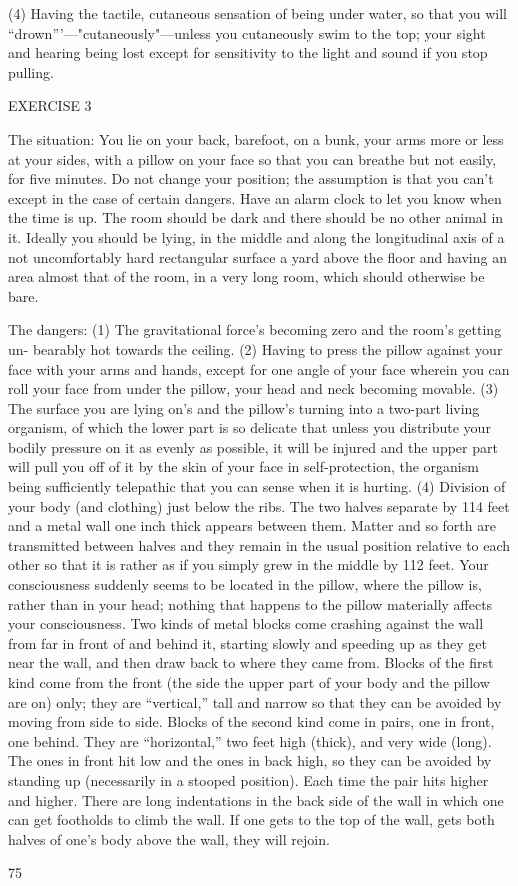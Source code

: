 (4) Having the tactile, cutaneous sensation of being under water, so that 
you will “drown”’—"cutaneously"—unless you cutaneously swim to the top; 
your sight and hearing being lost except for sensitivity to the light and sound 
if you stop pulling. 


EXERCISE 3 

The situation: You lie on your back, barefoot, on a bunk, your arms more 
or less at your sides, with a pillow on your face so that you can breathe but 
not easily, for five minutes. Do not change your position; the assumption is 
that you can’t except in the case of certain dangers. Have an alarm clock 
to let you know when the time is up. The room should be dark and there 
should be no other animal in it. Ideally you should be lying, in the middle 
and along the longitudinal axis of a not uncomfortably hard rectangular 
surface a yard above the floor and having an area almost that of the room, 
in a very long room, which should otherwise be bare. 

The dangers: 
(1) The gravitational force’s becoming zero and the room’s getting un- 
bearably hot towards the ceiling. 
(2) Having to press the pillow against your face with your arms and hands, 
except for one angle of your face wherein you can roll your face from under 
the pillow, your head and neck becoming movable. 
(3) The surface you are lying on’s and the pillow’s turning into a two-part 
living organism, of which the lower part is so delicate that unless you 
distribute your bodily pressure on it as evenly as possible, it will be injured 
and the upper part will pull you off of it by the skin of your face in 
self-protection, the organism being sufficiently telepathic that you can 
sense when it is hurting. 
(4) Division of your body (and clothing) just below the ribs. The two halves 
separate by 114 feet and a metal wall one inch thick appears between them. 
Matter and so forth are transmitted between halves and they remain in the 
usual position relative to each other so that it is rather as if you simply grew 
in the middle by 112 feet. Your consciousness suddenly seems to be located 
in the pillow, where the pillow is, rather than in your head; nothing that 
happens to the pillow materially affects your consciousness. Two kinds of 
metal blocks come crashing against the wall from far in front of and behind 
it, starting slowly and speeding up as they get near the wall, and then draw 
back to where they came from. Blocks of the first kind come from the front 
(the side the upper part of your body and the pillow are on) only; they are 
“vertical,” tall and narrow so that they can be avoided by moving from side 
to side. Blocks of the second kind come in pairs, one in front, one behind. 
They are “horizontal,” two feet high (thick), and very wide (long). The ones 
in front hit low and the ones in back high, so they can be avoided by standing 
up (necessarily in a stooped position). Each time the pair hits higher and 
higher. There are long indentations in the back side of the wall in which one 
can get footholds to climb the wall. If one gets to the top of the wall, gets 
both halves of one’s body above the wall, they will rejoin. 


75 



